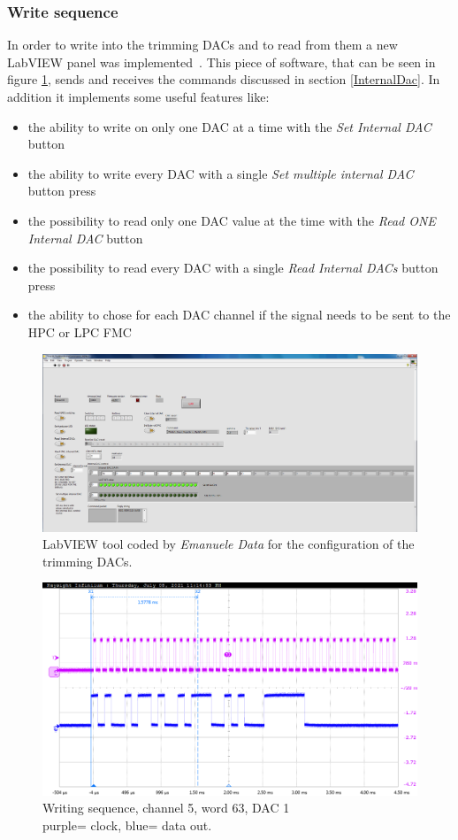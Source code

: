 \subsubsection{Write sequence}
\noindent In order to write into the trimming DACs and to read from them a new LabVIEW panel was implemented~\cite{data}. This piece of software, that can be seen in figure \ref{fig:labview3}, sends and receives the commands discussed in section \ref{InternalDac}. In addition it implements some useful features like:
\begin{itemize}
	\item the ability to write on only one DAC at a time with the \textit{Set Internal DAC} button
	\item the ability to write every DAC with a single \textit{Set multiple internal DAC} button press
	\item the possibility to read only one DAC value at the time with the \textit{Read ONE Internal DAC} button
	\item the possibility to read every DAC with a single \textit{Read Internal DACs} button press
	\item the ability to chose for each DAC channel if the signal needs to be sent to the HPC or LPC FMC
\end{itemize}
\begin{figure}[H]
	\centering
	\includegraphics[width=0.99\linewidth]{IMG/ch3/LABVIEW2}
	\caption{LabVIEW tool coded by \textit{Emanuele Data} for the configuration of the trimming DACs.}
	\label{fig:labview3}
\end{figure}
\begin{figure}[H]
	\centering
	\includegraphics[width=0.7\linewidth]{IMG/ch5/probe/09-08-2021_ch05-write63-baselinedac1}
	\caption{Writing sequence, channel 5, word 63, DAC 1\\{\color{magenta}purple}= clock, {\color{blue}blue}= data out.}
	\label{fig:ch05write63}
\end{figure}
